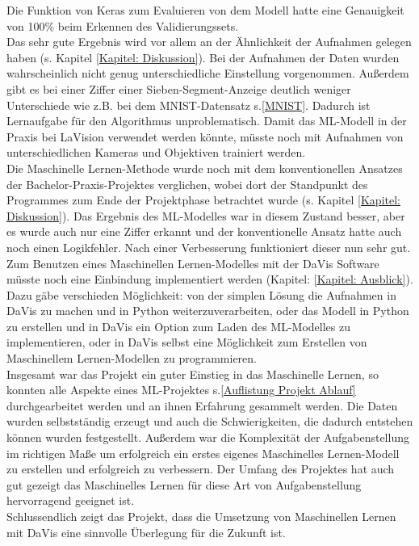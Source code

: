Die Funktion von Keras zum Evaluieren von dem Modell hatte eine Genauigkeit von 100\% beim Erkennen des Validierungssets. \\
Das sehr gute Ergebnis wird vor allem an der Ähnlichkeit der Aufnahmen gelegen haben (s. Kapitel \ref{Kapitel: Diskussion}).  Bei der Aufnahmen der Daten wurden wahrscheinlich nicht genug unterschiedliche Einstellung vorgenommen.  Außerdem gibt es bei einer Ziffer einer Sieben-Segment-Anzeige deutlich weniger Unterschiede wie z.B. bei dem MNIST-Datensatz s.\ref{MNIST}. Dadurch ist Lernaufgabe für den Algorithmus unproblematisch.  Damit das ML-Modell in der Praxis bei LaVision verwendet werden könnte,  müsste noch mit Aufnahmen von unterschiedlichen Kameras und Objektiven trainiert werden.\\
Die Maschinelle Lernen-Methode wurde noch mit dem konventionellen Ansatzes der Bachelor-Praxis-Projektes verglichen,  wobei dort der Standpunkt des Programmes zum Ende der Projektphase betrachtet wurde (s.  Kapitel \ref{Kapitel: Diskussion}).  Das Ergebnis des ML-Modelles war in diesem Zustand besser, aber es wurde auch nur eine Ziffer erkannt und der konventionelle Ansatz hatte auch noch einen Logikfehler. Nach einer Verbesserung funktioniert dieser nun sehr gut.\\
Zum Benutzen eines Maschinellen Lernen-Modelles mit der DaVis Software müsste noch eine Einbindung implementiert werden (Kapitel:  \ref{Kapitel: Ausblick}). Dazu gäbe verschieden Möglichkeit: von der simplen Lösung die Aufnahmen in DaVis zu machen und in Python weiterzuverarbeiten,  oder das Modell in Python zu erstellen und in DaVis ein Option zum Laden des ML-Modelles zu implementieren, oder in DaVis selbst eine Möglichkeit zum Erstellen von Maschinellem Lernen-Modellen zu programmieren. \\
Insgesamt war das Projekt ein guter Einstieg in das Maschinelle Lernen, so konnten alle Aspekte eines ML-Projektes s.\ref{Auflistung Projekt Ablauf} durchgearbeitet werden und an ihnen Erfahrung gesammelt werden.  Die Daten wurden selbstständig erzeugt und auch die Schwierigkeiten, die dadurch entstehen können wurden festgestellt. Außerdem war die Komplexität der Aufgabenstellung im richtigen Maße um erfolgreich ein erstes eigenes Maschinelles Lernen-Modell zu erstellen und erfolgreich zu verbessern.  Der Umfang des Projektes hat auch gut gezeigt das Maschinelles Lernen für diese Art von Aufgabenstellung hervorragend geeignet ist. \\
Schlussendlich zeigt das Projekt, dass die Umsetzung von Maschinellen Lernen mit DaVis eine sinnvolle Überlegung für die Zukunft ist.





